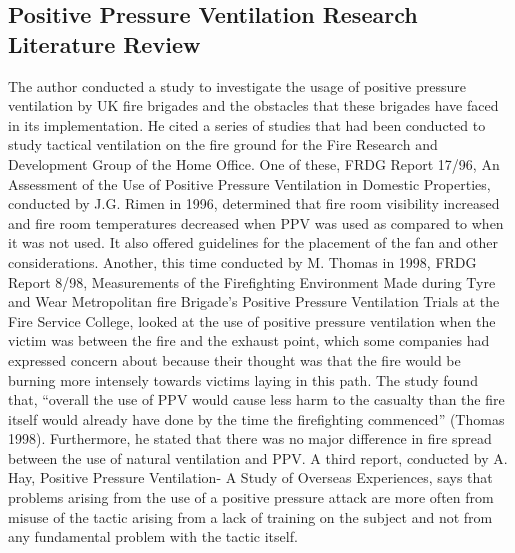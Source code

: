 \documentclass{article}
\begin{document}
\begin{appendices}
\subsection{Positive Pressure Ventilation Research Literature Review} \label{app:ResearchLiterature}
The author conducted a study to investigate the usage of positive pressure ventilation by UK fire brigades and the obstacles that these brigades have faced in its implementation. He cited a series of studies that had been conducted to study tactical ventilation on the fire ground for the Fire Research and Development Group of the Home Office. One of these, FRDG Report 17/96, An Assessment of the Use of Positive Pressure Ventilation in Domestic Properties, conducted by J.G. Rimen in 1996, determined that fire room visibility increased and fire room temperatures decreased when PPV was used as compared to when it was not used. It also offered guidelines for the placement of the fan and other considerations. Another, this time conducted by M. Thomas in 1998, FRDG Report 8/98, Measurements of the Firefighting Environment Made during Tyre and Wear Metropolitan fire Brigade’s Positive Pressure Ventilation Trials at the Fire Service College, looked at the use of positive pressure ventilation when the victim was between the fire and the exhaust point, which some companies had expressed concern about because their thought was that the fire would be burning more intensely towards victims laying in this path. The study found that, “overall the use of PPV would cause less harm to the casualty than the fire itself would already have done by the time the firefighting commenced” (Thomas 1998). Furthermore, he stated that there was no major difference in fire spread between the use of natural ventilation and PPV. A third report, conducted by A. Hay, Positive Pressure Ventilation- A Study of Overseas Experiences, says that problems arising from the use of a positive pressure attack are more often from misuse of the tactic arising from a lack of training on the subject and not from any fundamental problem with the tactic itself.\cite{YatestheU}
	

\end{appendices}
\end{document}
